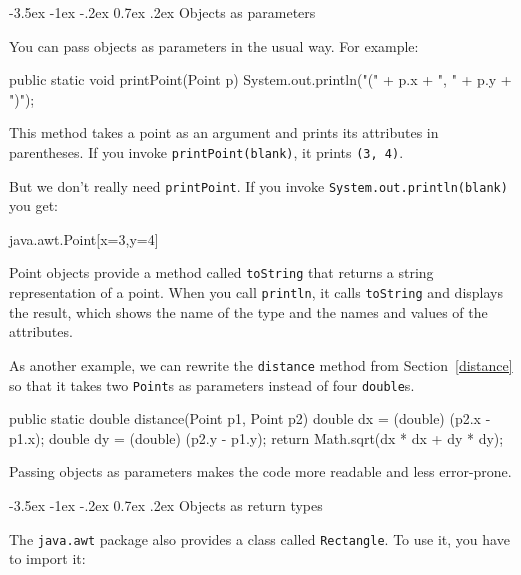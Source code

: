 \documentclass[12pt]{book}
\makeatletter
\theoremstyle{exercise}
\newcommand{\java}[1]{\verb"#1"}
\renewcommand{\section}{\@startsection{section}{1}{\z@}%
    {-3.5ex \@plus -1ex \@minus -.2ex}%
    {0.7ex \@plus.2ex}%
    {\normalfont\Large\bfseries}}
\newcommand{\java}[1]{\lstinline{#1}} %
\makeatother
\begin{document}
\section{Objects as parameters}


You can pass objects as parameters in the usual way.
For example:

\begin{code}
    public static void printPoint(Point p) {
        System.out.println("(" + p.x + ", " + p.y + ")");
    }
\end{code}

This method takes a point as an argument and prints its attributes in parentheses.
If you invoke \java{printPoint(blank)}, it prints \java{(3, 4)}.

But we don't really need \java{printPoint}.
If you invoke \java{System.out.println(blank)} you get:

\begin{stdout}
java.awt.Point[x=3,y=4]
\end{stdout}

Point objects provide a method called \java{toString} that returns a string representation of a point.
When you call \java{println}, it calls {\tt toString} and displays the result, which shows the name of the type and the names and values of the attributes.

As another example, we can rewrite the \java{distance} method from Section~\ref{distance} so that it takes two \java{Point}s as parameters instead of four \java{double}s.

\begin{code}
    public static double distance(Point p1, Point p2) {
        double dx = (double) (p2.x - p1.x);
        double dy = (double) (p2.y - p1.y);
        return Math.sqrt(dx * dx + dy * dy);
    }
\end{code}

Passing objects as parameters makes the code more readable and less error-prone.


\section{Objects as return types}


The \java{java.awt} package also provides a class called \java{Rectangle}.
To use it, you have to import it:
\end{document}
